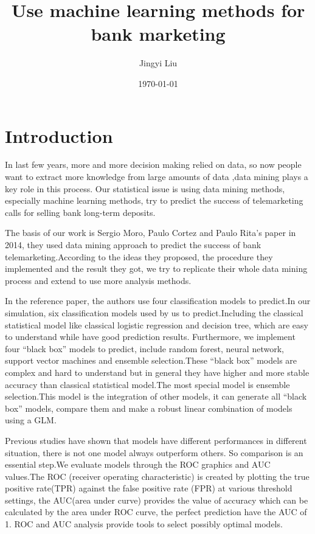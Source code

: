 \documentclass[12pt, a4paper, bibliography=totoc, english]{scrartcl}
\title{Use machine learning methods for bank marketing}
\author{Jingyi Liu}
\date{\today}
\begin{document}
	
	
	
	\clearpage
	
	\setcounter{page}{2}
	
	\tableofcontents
	
	\clearpage
	
	\listoffigures
	
	\clearpage
	
	\listoftables
	
	\clearpage
	
	\setcounter{page}{5}
	
	
	
	\section{Introduction}\label{Intro}
	In last few years, more and more decision making relied on data, so now people want to extract more knowledge from large amounts of data ,data mining plays a key role in this process. Our statistical issue is using data mining methods, especially machine learning methods, try to  predict the success of telemarketing calls for selling bank long-term deposits.
	
	The basis of our work is Sergio Moro, Paulo Cortez and Paulo Rita's paper in 2014, they used data mining approach to predict the success of bank telemarketing.According to the ideas they proposed, the procedure they implemented and the result they got, we try to replicate their whole data mining process and extend to use more analysis methods.
	
	
	In the reference paper, the authors use four classification models to predict.In our simulation,  six classification models used by us to predict.Including the classical statistical model like classical logistic regression and decision tree, which are easy to understand while have good prediction results. Furthermore, we implement four ``black box'' models to predict, include random forest, neural network, support vector machines and ensemble selection.These ``black box'' models are complex and hard to understand but in general they have higher and more stable accuracy than classical statistical model.The most special model is ensemble selection.This model is the integration of other models, it can generate all ``black box'' models, compare them and make a robust linear combination of models using a GLM. 
	
	Previous studies have shown that models have different performances in different situation, there is not one model always outperform others. So comparison is an essential step.We evaluate models through the ROC graphics and AUC values.The ROC (receiver operating characteristic) is created by plotting the true positive rate(TPR) against the false positive rate (FPR) at various threshold settings, the AUC(area under curve) provides the value of accuracy which can be calculated by the area under ROC curve, the perfect prediction have the AUC of 1. ROC  and AUC analysis provide tools to select possibly optimal models.
	
\end{document}
